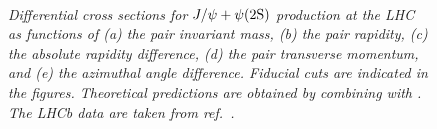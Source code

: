 \begin{figure}[htb!]
  \centering    
  \begin{subfigure}[t]{0.49\textwidth}
      
      \caption{}
      \label{subfig:mqq}
  \end{subfigure}\\
  \begin{subfigure}[t]{0.49\textwidth}
      
      \caption{}
      \label{subfig:yqq}
  \end{subfigure}
  \begin{subfigure}[t]{0.49\textwidth}
      
      \caption{}
      \label{subfig:Dy}
  \end{subfigure}
  \begin{subfigure}[t]{0.49\textwidth}
      
      \caption{}
      \label{subfig:ptqq}
  \end{subfigure}
  \begin{subfigure}[t]{0.49\textwidth}
      
      \caption{}
      \label{subfig:Dphi}
  \end{subfigure}
  \caption{\it Differential cross sections for $J/\psi + \psi(2\mathrm{S})$ production at the LHC as functions of (a) the pair invariant mass, (b) the pair rapidity, (c) the absolute rapidity difference, (d) the pair transverse momentum, and (e) the azimuthal angle difference. Fiducial cuts are indicated in the figures. Theoretical predictions are obtained by combining {\tt \mgshort} with {\tt {}}. The LHCb data are taken from ref.~\cite{LHCb:2023wsl}.\vspace*{-0.2\baselineskip}
  }
\label{fig:xsec-jpsi-psi2S}
\end{figure}


